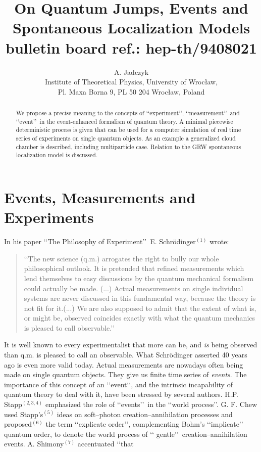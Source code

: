 \documentclass[12pt]{article}
\author{A.  Jadczyk \\
Institute of Theoretical Physics,
 University of Wroc{\l }aw,  \\
Pl.  Maxa Borna 9,  PL 50 204 Wroc{\l }aw,  Poland}
\title{On Quantum Jumps, Events and Spontaneous Localization Models\\
bulletin board ref.: hep-th/9408021}
\date{ }
\def\lqq{\lq\lq}
\def\rqq{\rq\rq}
\begin{document}
\maketitle
\begin{abstract}
We propose a precise meaning to the concepts of \lqq experiment\rq\rq,
\lqq measurement\rqq\,  and \lqq event\rqq\,  in the event-enhanced
formalism of quantum theory. A minimal piecewise deterministic process is
given that can be used for a computer simulation of real time series of
experiments on single quantum objects. As an example a generalized cloud
chamber is described, including multiparticle case. Relation to the GRW
spontaneous localization model is discussed.
\end{abstract}
\section{Events, Measurements and Experiments}
In his paper \lqq The Philosophy of Experiment\rqq\,  E.
Schr\"odinger$^{(1)}$
wrote:
\begin{quotation}
\lqq  The new science (q.m.) arrogates the right to bully our whole
philosophical outlook. It is pretended that refined measurements which
lend themselves to easy discussions by the quantum mechanical formalism
could actually be made. (...) Actual measurements on single individual
systems are never discussed in this fundamental way, because the theory
is not fit for it.(...) We are also supposed to admit that the extent of
what is, or might be, observed coincides exactly with what the quantum
mechanics is pleased to call observable.\rqq
\end{quotation}
It is well known to every experimentalist that more can be, and {\sl is}
being observed than q.m. is pleased to call an observable. What
Schr\"odinger asserted 40 years ago is even more valid today. Actual
measurements are nowadays often being made on single quantum objects.
They give us finite time series of {\sl events}. The importance of this
concept of an \lqq  event\lqq , and the intrinsic incapability of quantum
theory to
deal with it, have been stressed by several authors. H.P. Stapp$^{(2,3,4)}$
emphasized the role of \lqq events\rqq\,  in the \lqq world process\rqq. G.
F. Chew used
Stapp's$^{(5)}$ ideas on soft--photon creation--annihilation processes
and proposed$^{(6)}$ the term \lqq explicate order\rqq, complementing Bohm's
\lqq implicate\rqq\,  quantum order, to denote the world process of \lqq
gentle\rqq\,
creation--annihilation events. A. Shimony$^{(7)}$ accentuated \lqq  that
\end{document}
